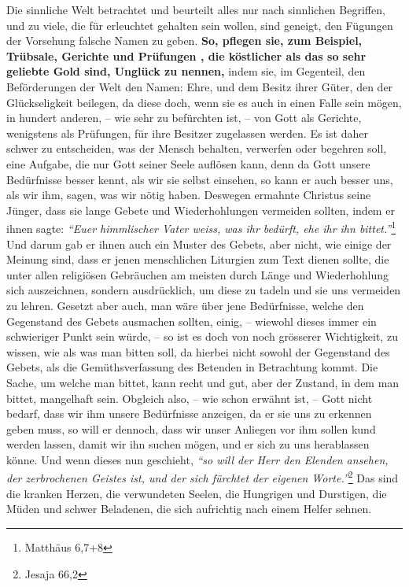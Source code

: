 \medskip

\label{ref:06_13_auf_die_probe_gestellt}
Die sinnliche Welt betrachtet und beurteilt alles nur nach sinnlichen
Begriffen, und zu viele, die für erleuchtet 
gehalten sein wollen, sind
geneigt, den Fügungen der Vorsehung falsche Namen zu geben.
\textbf{So, pflegen
sie, zum
Beispiel, Trübsale, Gerichte und Prüfungen , die köstlicher
als das so sehr
geliebte Gold sind, Unglück  zu nennen,} indem sie, im
Gegenteil, den
Beförderungen der Welt den Namen: Ehre, und dem Besitz ihrer Güter, den der
Glückseligkeit  beilegen, da diese doch, wenn sie es auch
in einen Falle sein
mögen, in hundert anderen, -- wie sehr zu befürchten ist, -- von Gott als
Gerichte, wenigstens als Prüfungen, für ihre Besitzer zugelassen
werden. Es ist
daher schwer zu entscheiden, was der Mensch behalten, verwerfen oder begehren
soll, eine Aufgabe, die nur Gott seiner Seele auflösen
kann, denn da Gott unsere
Bedürfnisse  besser kennt, als wir sie
selbst einsehen, so kann er auch besser
uns, als wir ihm, sagen, was wir nötig haben. Deswegen ermahnte Christus seine
Jünger, dass sie lange Gebete und Wiederhohlungen vermeiden sollten, indem er
ihnen sagte:
\textit{"`Euer himmlischer Vater weiss, was ihr bedürft, ehe ihr ihn
bittet."'}\footnote{Matthäus 6,7+8}
Und darum gab er ihnen auch ein Muster des
Gebets, aber nicht, wie einige der Meinung sind, dass er jenen menschlichen
Liturgien zum Text dienen sollte, die unter allen religiösen Gebräuchen am
meisten durch Länge und Wiederhohlung sich auszeichnen, sondern ausdrücklich,
um diese zu tadeln und sie uns vermeiden zu lehren. Gesetzt aber auch, man wäre
über jene Bedürfnisse, welche den Gegenstand des Gebets ausmachen sollten,
einig, -- wiewohl dieses immer ein schwieriger Punkt sein würde, -- so ist es
doch von noch grösserer Wichtigkeit, zu wissen, wie als was man bitten soll, da
hierbei nicht sowohl der Gegenstand des Gebets, als die Gemüthsverfassung des
Betenden in Betrachtung kommt. Die Sache, um welche man bittet, kann recht und
gut, aber der Zustand, in dem man bittet, mangelhaft sein. Obgleich also, -- wie
schon erwähnt ist, -- Gott nicht bedarf, dass wir ihm unsere Bedürfnisse
anzeigen, da er sie uns zu erkennen geben muss, so will er dennoch, dass wir
unser Anliegen vor ihm sollen kund werden lassen, damit wir ihn suchen mögen,
und er sich zu uns herablassen könne. Und wenn dieses nun geschieht,
\textit{"`so will der Herr den Elenden ansehen, der zerbrochenen Geistes ist,
und der sich fürchtet der eigenen Worte."'}\footnote{Jesaja 66,2}
Das sind die kranken Herzen, die
verwundeten Seelen, die Hungrigen und Durstigen, die Müden
und schwer Beladenen,
die sich aufrichtig nach einem Helfer sehnen.

